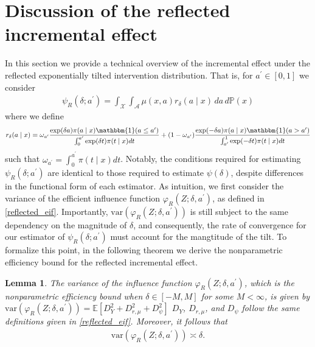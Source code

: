 \documentclass[11pt,twoside]{article}
\newcommand{\var}{\text{var}}
\newtheorem{lemma}{Lemma}
\theoremstyle{definition}
\theoremstyle{remark}
\begin{document}
\newpage 


\section{Discussion of the reflected incremental effect} \label{reflected_ie_section}

In this section we provide a technical overview of the incremental effect under the reflected exponentially tilted intervention distribution. That is, for $a^\prime \in [0, 1]$ we consider
\begin{align*}
    \psi_R(\delta; a^\prime) =  \int_\mathcal{X} \int_\mathcal{A} \mu(x, a) r_\delta(a \mid x) \, da \, d\mathbb{P}(x)
\end{align*}
where we define
\begin{align*}
    r_\delta(a \mid x) =  \omega_{a^\prime}\frac{\text{exp}(\delta a) \pi(a \mid x) \mathbbm{1}(a \leq a^\prime) }{\int^{a^\prime}_0 \text{exp}(\delta t) \pi(t \mid x) dt} +  (1-\omega_{a^\prime})\frac{\text{exp}(-\delta a) \pi(a \mid x) \mathbbm{1}(a > a^\prime)}{\int^{1}_{a^\prime} \text{exp}(-\delta t) \pi(t \mid x) dt}
\end{align*}
such that $\omega_{a^\prime} = \int^{a^{\prime}}_0 \pi(t \mid x) dt$. Notably, the conditions required for estimating $\psi_R(\delta; a^\prime)$ are identical to those required to estimate $\psi(\delta)$, despite differences in the functional form of each estimator. As intuition, we first consider the variance of the efficient influence function $\varphi_R(Z;\delta, a^\prime)$, as defined in \cref{reflected_eif}. Importantly, $\var(\varphi_R(Z;\delta, a^\prime))$ is still subject to the same dependency on the magnitude of $\delta$, and consequently, the rate of convergence for our estimator of $\psi_R(\delta; a^\prime)$ must account for the mangtitude of the tilt. To formalize this point, in the following theorem we derive the nonparametric efficiency bound for the reflected incremental effect.

\begin{lemma} \label{reflected_efficiency_bound}
    The variance of the influence function $\varphi_R(Z;\delta, a^\prime )$, which is the nonparametric efficiency bound when $\delta \in [-M,M]$ for some $M<\infty$, is given by $\var(\varphi_R(Z;\delta, a^\prime)) = \mathbb{E}[D^2_Y + D^2_{r, \mu} + D^2_\psi]$ $D_Y$, $D_{r, \mu}$, and $D_\psi$ follow the same definitions given in \cref{reflected_eif}. Moreover, it follows that
    \begin{align*}
        \var(\varphi_R(Z;\delta, a^\prime)) \asymp \delta.
    \end{align*}
\end{lemma}
\end{document}
